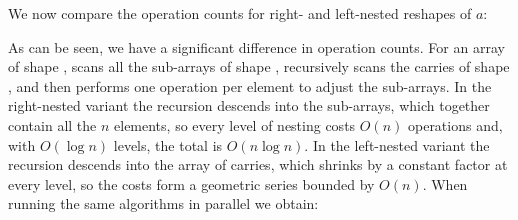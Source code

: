 We now compare the operation counts for right- and left-nested reshapes of $a$:
As can be seen, we have a significant difference in operation counts.  For an
array of shape \;\;,  scans all the sub-arrays of
shape , recursively scans the carries of shape , and then performs
one operation per element to adjust the sub-arrays.  In the right-nested
variant the recursion descends into the sub-arrays, which together contain all
the $n$ elements, so every level of nesting costs $O(n)$ operations and, with
$O(\log n)$ levels, the total is $O(n\log n)$.  In the left-nested variant the
recursion descends into the array of carries, which shrinks by a constant
factor at every level, so the costs form a geometric series bounded by $O(n)$.
When running the same algorithms in parallel we obtain:
